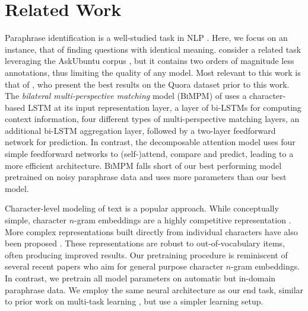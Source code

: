 \documentclass[11pt,letterpaper]{article}
\begin{document}
\section{Related Work}\label{rel-work}
Paraphrase identification is a well-studied task in NLP \cite[\textit{inter alia}]{das2009paraphrase,chang2010discriminative,he-gimpel-lin:2015:EMNLP,wang-mi-ittycheriah:2016:COLING}.  Here, we focus on an instance, that of finding questions with identical meaning.   consider a related task leveraging the AskUbuntu corpus \cite{dossantos-EtAl:2015:ACL-IJCNLP}, but it contains two orders of magnitude less annotations, thus limiting the quality of any model. Most relevant to this work is that of , who present the best results on the Quora dataset prior to this work. The \emph{bilateral multi-perspective matching} model (\textsc{BiMPM}) of \citeauthor{wang:2017:ijcai} uses a character-based LSTM \cite{hochreiter1997long} at its input representation layer, a layer of bi-LSTMs for computing context information, four different types of multi-perspective matching layers, an additional bi-LSTM aggregation layer, followed by a two-layer feedforward network for prediction.
In contrast, the decomposable attention model uses four simple feedforward networks to (self-)attend, compare and predict, leading to a more efficient architecture.
\textsc{BiMPM} falls short of our best performing model pretrained on noisy paraphrase data and uses more parameters than our best model.

Character-level modeling of text is a popular approach.
While conceptually simple, character $n$-gram embeddings are a highly competitive representation \cite{huang-deep-structured-semantic,wieting-EtAl:2016:EMNLP2016,DBLP:journals/corr/BojanowskiGJM16}.
More complex representations built directly from individual characters have also been proposed \cite{sennrich-haddow-birch:2016:P16-12,luong-manning:2016:P16-1,Kim:2016:CNL:3016100.3016285,chung-cho-bengio:2016:P16-1,ling-EtAl:2015:EMNLP2}.
These representations are robust to out-of-vocabulary items, often producing improved results.  Our pretraining procedure is reminiscent of several recent papers \cite[\textit{inter alia}]{wieting-EtAl:2016:EMNLP2016} who aim for general purpose character $n$-gram embeddings.  In contrast, we pretrain all model parameters on automatic but in-domain paraphrase data.  We employ the same neural architecture as our end task, similar to prior work on multi-task learning \cite[\textit{inter alia}]{sogaard-goldberg:2016:P16-2}, but use a simpler learning setup.
\end{document}
